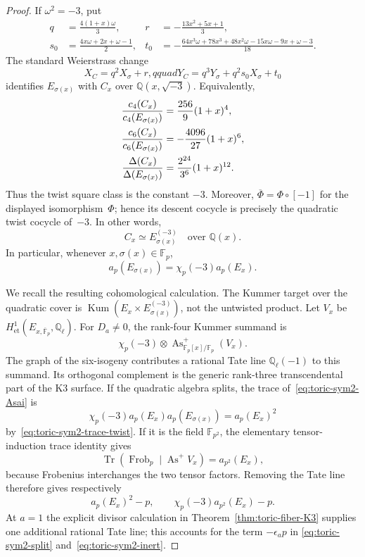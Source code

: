 \begin{proof}
If $\omega^2=-3$, put
\begin{align*}
 q&=\frac{4(1+x)\omega}{3},
 &r&=-\frac{13x^2+5x+1}{3},\\
 s_0&=\frac{4x\omega+2x+\omega-1}{2},
 &t_0&=-\frac{64x^3\omega+78x^3+48x^2\omega
 -15x\omega-9x+\omega-3}{18}.
\end{align*}
The standard Weierstrass change
\[
 X_C=q^2X_{\sigma}+r,qquad
 Y_C=q^3Y_{\sigma}+q^2s_0X_{\sigma}+t_0
\]
identifies $E_{\sigma(x)}$ with $C_x$ over
$\mathbb Q(x,\sqrt{-3})$.  Equivalently,
\begin{align}
 \frac{c_4(C_x)}{c_4(E_{\sigma(x)})}
 &=\frac{256}{9}(1+x)^4,\notag\\
 \frac{c_6(C_x)}{c_6(E_{\sigma(x)})}
 &=-\frac{4096}{27}(1+x)^6,\notag\\
 \frac{\Delta(C_x)}{\Delta(E_{\sigma(x)})}
 &=\frac{2^{24}}{3^6}(1+x)^{12}.
 \label{eq:toric-sym2-twist-invariants}
\end{align}
Thus the twist square class is the constant $-3$.
Moreover, $\overline\Phi=\Phi\circ[-1]$ for the displayed
isomorphism~$\Phi$; hence its
descent cocycle is precisely the quadratic twist cocycle of~$-3$.  In other
words,
\begin{equation}
 C_x\simeq E_{\sigma(x)}^{(-3)}
 \quad\text{over }\mathbb Q(x).
 \label{eq:toric-sym2-twisted-factor}
\end{equation}
In particular, whenever
$x,\sigma(x)\in\mathbb F_p$,
\begin{equation}
 a_p(E_{\sigma(x)})=\chi_p(-3)a_p(E_x).
 \label{eq:toric-sym2-trace-twist}
\end{equation}

We recall the resulting cohomological calculation.  The Kummer target over
the quadratic cover is
$\operatorname {Kum}(E_x\times E_{\sigma(x)}^{(-3)})$, not the untwisted
product.  Let $V_x$ be
$H^1_{\mathrm{et}}(E_{x,\overline{\mathbb F}_p},\mathbb Q_\ell)$.
For $D_a\ne0$, the rank-four Kummer summand is
\begin{equation}
 \chi_p(-3)\otimes
 \operatorname {As}^{+}_{\mathbb F_p[x]/\mathbb F_p}(V_x).
 \label{eq:toric-sym2-Asai}
\end{equation}
The graph of the six-isogeny contributes a rational Tate line
$\mathbb Q_\ell(-1)$ to this summand.  Its orthogonal complement is the
generic rank-three transcendental part of the K3 surface.  If the quadratic
algebra splits, the trace of~\eqref{eq:toric-sym2-Asai} is
\[
 \chi_p(-3)a_p(E_x)a_p(E_{\sigma(x)})=a_p(E_x)^2
\]
by~\eqref{eq:toric-sym2-trace-twist}.  If it is the field
$\mathbb F_{p^2}$, the elementary tensor-induction trace identity gives
\[
 \operatorname {Tr}(\operatorname {Frob}_p\mid
 \operatorname {As}^{+}V_x)=a_{p^2}(E_x),
\]
because Frobenius interchanges the two tensor factors.  Removing the Tate
line therefore gives respectively
\[
 a_p(E_x)^2-p,
 \qquad
 \chi_p(-3)a_{p^2}(E_x)-p.
\]
At $a=1$ the explicit divisor calculation in
Theorem~\ref{thm:toric-fiber-K3} supplies one additional rational Tate line;
this accounts for the term $-\epsilon_ap$ in
\eqref{eq:toric-sym2-split} and~\eqref{eq:toric-sym2-inert}.


\end{proof}
